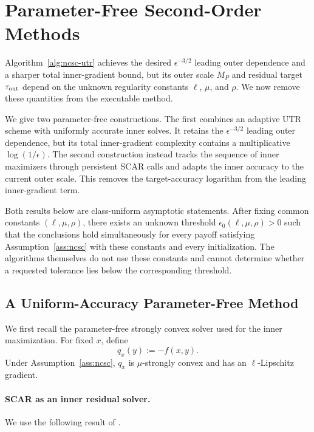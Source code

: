 \section{Parameter-Free Second-Order Methods}
\label{sec:parameter-free}

Algorithm~\ref{alg:ncsc-utr} achieves the desired
$\epsilon^{-3/2}$ leading outer dependence and a sharper total
inner-gradient bound, but its outer scale $M_P$ and residual target
$\tau_{\rm out}$ depend on the unknown regularity constants
$\ell$, $\mu$, and $\rho$. We now remove these quantities from the
executable method.

We give two parameter-free constructions. The first combines an
adaptive UTR scheme with uniformly accurate inner solves. It retains
the $\epsilon^{-3/2}$ leading outer dependence, but its total
inner-gradient complexity contains a multiplicative
$\log(1/\epsilon)$. The second construction instead tracks the
sequence of inner maximizers through persistent SCAR calls and adapts
the inner accuracy to the current outer scale. This removes the
target-accuracy logarithm from the leading inner-gradient term.

Both results below are class-uniform asymptotic statements. After
fixing common constants $(\ell,\mu,\rho)$, there exists an unknown
threshold $\epsilon_0(\ell,\mu,\rho)>0$ such that the conclusions hold
simultaneously for every payoff satisfying
Assumption~\ref{ass:ncsc} with these constants and every
initialization. The algorithms themselves do not use these constants
and cannot determine whether a requested tolerance lies below the
corresponding threshold.


\subsection{A Uniform-Accuracy Parameter-Free Method}
\label{sec:uniform-parameter-free}

We first recall the parameter-free strongly convex solver used for
the inner maximization. For fixed $x$, define
\[
    q_x(y):=-f(x,y).
\]
Under Assumption~\ref{ass:ncsc}, $q_x$ is $\mu$-strongly convex and
has an $\ell$-Lipschitz gradient.


\paragraph{SCAR as an inner residual solver.}

We use the following result of \citet{lan2026optimal}.

